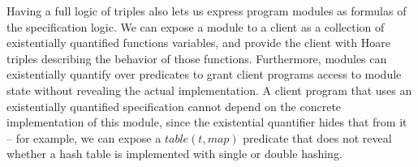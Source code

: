 \documentclass[preprint,natbib]{sigplanconf}
\begin{document}
Having a full logic of triples also lets us express program modules as
formulas of the specification logic. We can expose a module to a
client as a collection of existentially quantified functions
variables, and provide the client with Hoare triples describing the
behavior of those functions. Furthermore, modules can existentially
quantify over predicates to grant client programs access to module
state without revealing the actual implementation. A client program
that uses an existentially quantified specification cannot depend on
the concrete implementation of this module, since the existential
quantifier hides that from it -- for example, we can expose a
$table(t, map)$ predicate that does not reveal whether a hash table is
implemented with single or double hashing.
 
% 
\end{document}
